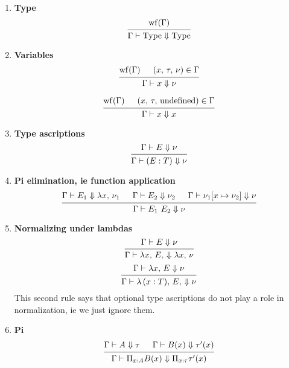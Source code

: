 \documentclass{article}
\begin{document}
\begin{enumerate}
\item \textbf{Type}
  \[
    \begin{prooftree}
      \hypo{\wf(\Gamma)}
      \infer1{\Gamma \vdash \Type \Downarrow \Type} 
    \end{prooftree}
  \]
\item \textbf{Variables} \\
  \[
    \begin{prooftree}
      \hypo{\wf(\Gamma)}
      \hypo{(x, \, \tau, \, \nu) \in \Gamma}
      \infer2{\Gamma \vdash x \Downarrow \nu}
    \end{prooftree} 
  \]

  \[
    \begin{prooftree}
      \hypo{\wf(\Gamma)}
      \hypo{(x, \, \tau, \, \text{undefined}) \in \Gamma}
      \infer2{\Gamma \vdash x \Downarrow x}
    \end{prooftree} 
  \]

\item \textbf{Type ascriptions} \\
  \[
    \begin{prooftree}
      \hypo{\Gamma \vdash E \Downarrow \nu}
      \infer1{\Gamma \vdash (E : T) \Downarrow \nu}
    \end{prooftree}
  \]
  
\item \textbf{Pi elimination, ie function application} \\
  \[
    \begin{prooftree}
      \hypo{\Gamma \vdash E_1 \Downarrow \lambda x, \, \nu_1}
      \hypo{\Gamma \vdash E_2 \Downarrow \nu_2}
      \hypo{\Gamma \vdash \nu_1[x \mapsto \nu_2] \Downarrow \nu}
      \infer3{\Gamma \vdash E_1 \,\, E_2 \Downarrow \nu}
    \end{prooftree}
  \]

\item \textbf{Normalizing under lambdas} \\
  \[
    \begin{prooftree}
      \hypo{\Gamma \vdash E \Downarrow \nu}
      \infer1{\Gamma \vdash \lambda x, \, E, \, \Downarrow \lambda x, \, \nu}
    \end{prooftree}
  \]
  \[
    \begin{prooftree}
      \hypo{\Gamma \vdash \lambda x, \, E \Downarrow \nu}
      \infer1{\Gamma \vdash \lambda \, (x : T), \, E, \, \Downarrow \nu}
    \end{prooftree}
  \]
  This second rule says that optional type ascriptions do not play a role in
  normalization, ie we just ignore them.

\item \textbf{Pi} \\
  \[
    \begin{prooftree}
      \hypo{\Gamma \vdash A \Downarrow \tau}
      \hypo{\Gamma \vdash B(x) \Downarrow \tau'(x)}
      \infer2{\Gamma \vdash \Pi_{x : A} B(x) \Downarrow \Pi_{x : \tau} \tau'(x)}
    \end{prooftree}
  \]
\end{enumerate}
\end{document}
